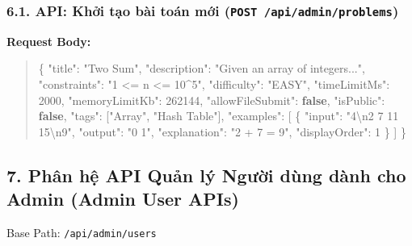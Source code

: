 \documentclass[12pt,a4paper]{article}
\renewcommand{\_}{\BreakableUnderscore}
\newenvironment{Shaded}{\vspace{3pt}\begin{quote}}{\end{quote}\vspace{3pt}}
\newcommand{\CharTok}[1]{\textcolor[rgb]{0.25,0.44,0.63}{#1}}
\newcommand{\DataTypeTok}[1]{\textcolor[rgb]{0.56,0.13,0.00}{#1}}
\newcommand{\DecValTok}[1]{\textcolor[rgb]{0.25,0.63,0.44}{#1}}
\newcommand{\FunctionTok}[1]{\textcolor[rgb]{0.02,0.16,0.49}{#1}}
\newcommand{\KeywordTok}[1]{\textcolor[rgb]{0.00,0.44,0.13}{\textbf{#1}}}
\newcommand{\OtherTok}[1]{\textcolor[rgb]{0.00,0.44,0.13}{#1}}
\newcommand{\StringTok}[1]{\textcolor[rgb]{0.25,0.44,0.63}{#1}}
\begin{document}
\subsubsection{\texorpdfstring{6.1. API: Khởi tạo bài toán mới (\texttt{POST\ /api/admin/problems})}{6.1. API: Khởi tạo bài toán mới (POST /api/admin/problems)}}

\textbf{Request Body:}

\begin{Shaded}
\begin{Highlighting}[]
\FunctionTok{\{}
  \DataTypeTok{"title"}\FunctionTok{:} \StringTok{"Two Sum"}\FunctionTok{,}
  \DataTypeTok{"description"}\FunctionTok{:} \StringTok{"Given an array of integers..."}\FunctionTok{,}
  \DataTypeTok{"constraints"}\FunctionTok{:} \StringTok{"1 \textless{}= n \textless{}= 10\^{}5"}\FunctionTok{,}
  \DataTypeTok{"difficulty"}\FunctionTok{:} \StringTok{"EASY"}\FunctionTok{,}
  \DataTypeTok{"timeLimitMs"}\FunctionTok{:} \DecValTok{2000}\FunctionTok{,}
  \DataTypeTok{"memoryLimitKb"}\FunctionTok{:} \DecValTok{262144}\FunctionTok{,}
  \DataTypeTok{"allowFileSubmit"}\FunctionTok{:} \KeywordTok{false}\FunctionTok{,}
  \DataTypeTok{"isPublic"}\FunctionTok{:} \KeywordTok{false}\FunctionTok{,}
  \DataTypeTok{"tags"}\FunctionTok{:} \OtherTok{[}\StringTok{"Array"}\OtherTok{,} \StringTok{"Hash Table"}\OtherTok{]}\FunctionTok{,}
  \DataTypeTok{"examples"}\FunctionTok{:} \OtherTok{[}
    \FunctionTok{\{}
      \DataTypeTok{"input"}\FunctionTok{:} \StringTok{"4}\CharTok{\textbackslash{}n}\StringTok{2 7 11 15}\CharTok{\textbackslash{}n}\StringTok{9"}\FunctionTok{,}
      \DataTypeTok{"output"}\FunctionTok{:} \StringTok{"0 1"}\FunctionTok{,}
      \DataTypeTok{"explanation"}\FunctionTok{:} \StringTok{"2 + 7 = 9"}\FunctionTok{,}
      \DataTypeTok{"displayOrder"}\FunctionTok{:} \DecValTok{1}
    \FunctionTok{\}}
  \OtherTok{]}
\FunctionTok{\}}
\end{Highlighting}
\end{Shaded}

\subsection{7. Phân hệ API Quản lý Người dùng dành cho Admin (Admin User APIs)}

Base Path: \texttt{/api/admin/users}
\end{document}
